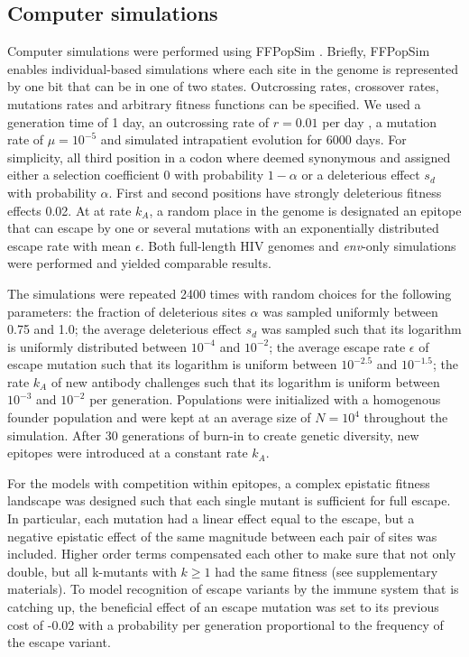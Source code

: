 \documentclass[rmp, twocolumn]{revtex4}
\newcommand{\env}{\textit{env}}
\begin{document}
\subsection{Computer simulations}
Computer simulations were performed using FFPopSim
\citep{zanini_ffpopsim:_2012}. Briefly, FFPopSim enables individual-based
simulations where each site in the genome is represented by one bit that can be
in one of two states. Outcrossing rates, crossover rates, mutations rates and
arbitrary fitness functions can be specified. We used a generation time of 1
day, an outcrossing rate of $r=0.01$ per day \citep{batorsky_estimate_2011,
neher_recombination_2010}, a mutation rate of $\mu=10^{-5}$
\citep{mansky_lower_1995, abram_nature_2010} and simulated intrapatient
evolution for 6000 days. For simplicity, all third position in a codon where
deemed synonymous and assigned either a selection coefficient $0$ with
probability $1-\alpha$ or a deleterious effect $s_d$ with probability $\alpha$.
First and second positions have strongly deleterious fitness effects 0.02. At at
rate $k_A$, a random place in the genome is designated an epitope that can
escape by one or several mutations with an exponentially distributed escape rate
with mean $\epsilon$. Both full-length HIV genomes and \env{}-only simulations
were performed and yielded comparable results.

The simulations were repeated 2400 times with random choices for the following
parameters: the fraction of deleterious sites $\alpha$ was sampled uniformly
between 0.75 and 1.0; the average deleterious effect $s_d$ was sampled such that
its logarithm is uniformly distributed  between $10^{-4}$ and $10^{-2}$; the
average escape rate $\epsilon$ of escape mutation such that its logarithm is
uniform between $10^{-2.5}$ and $10^{-1.5}$; the rate $k_A$ of new antibody
challenges such that its logarithm is uniform between $10^{-3}$ and $10^{-2}$
per generation. Populations were initialized with a homogenous founder
population and were kept at an average size of $N=10^4$ throughout the
simulation. After 30 generations of burn-in to create genetic diversity, new
epitopes were introduced at a constant rate $k_A$. 

For the models with competition within epitopes, a complex epistatic fitness
landscape was designed such that each single mutant is sufficient for full
escape. In particular, each mutation had a linear effect equal to the escape,
but a negative epistatic effect of the same magnitude between each pair of sites
was included. Higher order terms compensated each other to make sure that not
only double, but all k-mutants with $k \geq 1$ had the same fitness (see
supplementary materials). To model recognition of escape variants by the immune
system that is catching up, the beneficial effect of an escape mutation was set
to its previous cost of -0.02 with a probability per generation proportional to
the frequency of the escape variant.
\end{document}

